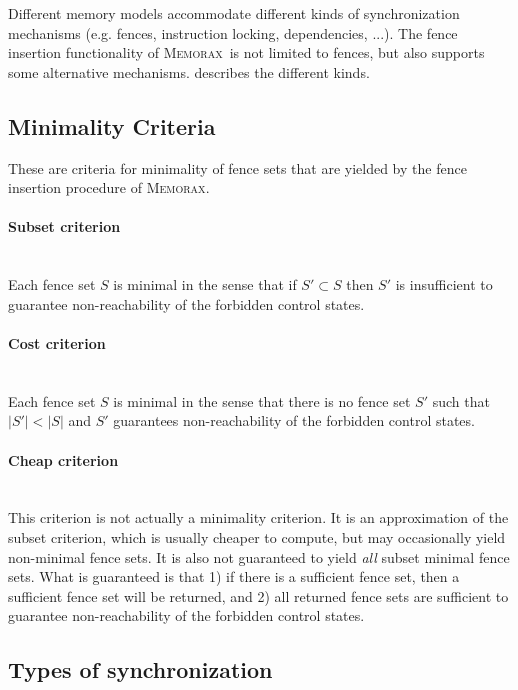 \documentclass[a4paper]{article}
\newcommand{\memorax}{\textsc{Memorax}}
\begin{document}
Different memory models accommodate different kinds of synchronization
mechanisms (e.g. fences, instruction locking, dependencies, ...). The
fence insertion functionality of \memorax\ is not limited to fences,
but also supports some alternative mechanisms. 
describes the different kinds.

\subsection{Minimality Criteria}\label{sec:min:criteria}

These are criteria for minimality of fence sets that are yielded by
the fence insertion procedure of \memorax.

\paragraph{Subset criterion}\mbox{}\\
%
Each fence set $S$ is minimal in the sense that if $S'\subset S$ then
$S'$ is insufficient to guarantee non-reachability of the forbidden
control states.

\paragraph{Cost criterion}\mbox{}\\
%
Each fence set $S$ is minimal in the sense that there is no fence set
$S'$ such that $|S'| < |S|$ and $S'$ guarantees non-reachability of
the forbidden control states.

\paragraph{Cheap criterion}\mbox{}\\
%
This criterion is not actually a minimality criterion. It is an
approximation of the subset criterion, which is usually cheaper to
compute, but may occasionally yield non-minimal fence sets. It is also
not guaranteed to yield {\em all} subset minimal fence sets. What is
guaranteed is that 1) if there is a sufficient fence set, then a
sufficient fence set will be returned, and 2) all returned fence sets
are sufficient to guarantee non-reachability of the forbidden control
states.

\subsection{Types of synchronization}\label{sec:sync:types}
\end{document}
